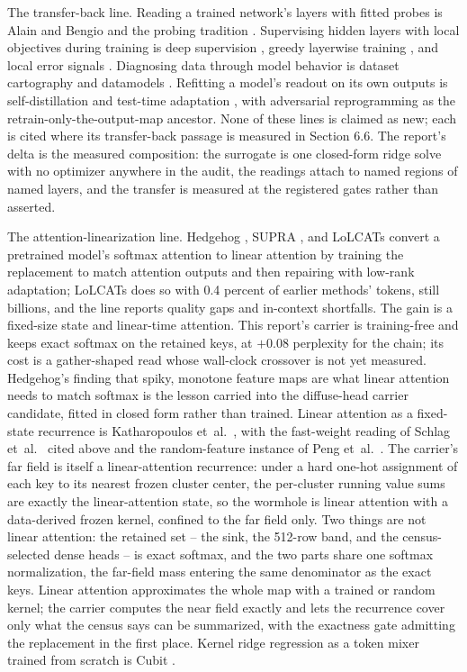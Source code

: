 \documentclass[11pt]{article}
\begin{document}
The transfer-back line. Reading a trained network's layers with
fitted probes is Alain and Bengio \cite{alain2016} and the
probing tradition \cite{tenney2019}. Supervising hidden layers
with local objectives during training is deep supervision
\cite{lee2015}, greedy layerwise training \cite{belilovsky2019},
and local error signals \cite{nokland2019}. Diagnosing data
through model behavior is dataset cartography
\cite{swayamdipta2020} and datamodels \cite{ilyas2022}.
Refitting a model's readout on its own outputs is
self-distillation \cite{furlanello2018, zhang2019byot} and
test-time adaptation \cite{sun2020ttt, wang2021tent}, with
adversarial reprogramming \cite{elsayed2019} as the
retrain-only-the-output-map ancestor. None of these lines is
claimed as new; each is cited where its transfer-back passage
is measured in Section 6.6. The report's delta is the measured
composition: the surrogate is one closed-form ridge solve with
no optimizer anywhere in the audit, the readings attach to
named regions of named layers, and the transfer is measured at
the registered gates rather than asserted.

The attention-linearization line. Hedgehog \cite{hedgehog2024},
SUPRA \cite{supra2024}, and LoLCATs \cite{lolcats2024} convert a
pretrained model's softmax attention to linear attention by
training the replacement to match attention outputs and then
repairing with low-rank adaptation; LoLCATs does so with 0.4
percent of earlier methods' tokens, still billions, and the line
reports quality gaps and in-context shortfalls. The gain is a
fixed-size state and linear-time attention. This report's carrier
is training-free and keeps exact softmax on the retained keys, at
$+0.08$ perplexity for the chain; its cost is a gather-shaped read
whose wall-clock crossover is not yet measured. Hedgehog's finding
that spiky, monotone feature maps are what linear attention needs
to match softmax is the lesson carried into the diffuse-head
carrier candidate, fitted in closed form rather than trained.
Linear attention as a fixed-state recurrence is Katharopoulos
et~al.~\cite{katharopoulos2020}, with the fast-weight reading of
Schlag et~al.~\cite{schlag2021} cited above and the
random-feature instance of Peng et~al.~\cite{peng2021random}.
The carrier's far field is itself a linear-attention recurrence:
under a hard one-hot assignment of each key to its nearest frozen
cluster center, the per-cluster running value sums are exactly
the linear-attention state, so the wormhole is linear attention
with a data-derived frozen kernel, confined to the far field
only. Two things are not linear attention: the retained set --
the sink, the 512-row band, and the census-selected dense heads --
is exact softmax, and the two parts share one softmax
normalization, the far-field mass entering the same denominator
as the exact keys. Linear attention approximates the whole map
with a trained or random kernel; the carrier computes the near
field exactly and lets the recurrence cover only what the census
says can be summarized, with the exactness gate admitting the
replacement in the first place.
Kernel ridge regression as a token mixer trained from scratch is
Cubit \cite{cubit2026}.
\end{document}
